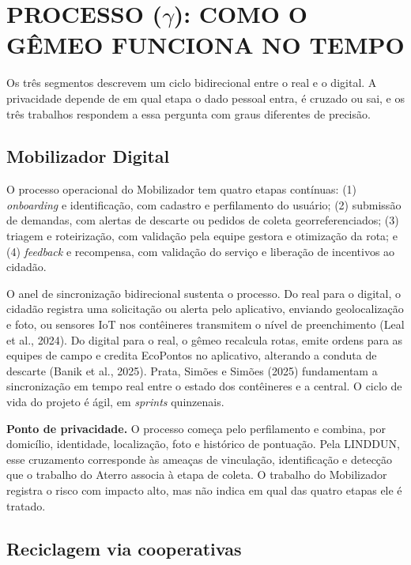 \documentclass[12pt,a4paper,article,oneside,english,brazil]{abntex2}
\begin{document}
\section{PROCESSO (\texorpdfstring{$\gamma$}{gama}): COMO O GÊMEO FUNCIONA NO TEMPO}

Os três segmentos descrevem um ciclo bidirecional entre o real e o digital. A privacidade depende de em qual etapa o dado pessoal entra, é cruzado ou sai, e os três trabalhos respondem a essa pergunta com graus diferentes de precisão.

\subsection{Mobilizador Digital}

O processo operacional do Mobilizador tem quatro etapas contínuas: (1) \textit{onboarding} e identificação, com cadastro e perfilamento do usuário; (2) submissão de demandas, com alertas de descarte ou pedidos de coleta georreferenciados; (3) triagem e roteirização, com validação pela equipe gestora e otimização da rota; e (4) \textit{feedback} e recompensa, com validação do serviço e liberação de incentivos ao cidadão.

O anel de sincronização bidirecional sustenta o processo. Do real para o digital, o cidadão registra uma solicitação ou alerta pelo aplicativo, enviando geolocalização e foto, ou sensores IoT nos contêineres transmitem o nível de preenchimento (Leal et al., 2024). Do digital para o real, o gêmeo recalcula rotas, emite ordens para as equipes de campo e credita EcoPontos no aplicativo, alterando a conduta de descarte (Banik et al., 2025). Prata, Simões e Simões (2025) fundamentam a sincronização em tempo real entre o estado dos contêineres e a central. O ciclo de vida do projeto é ágil, em \textit{sprints} quinzenais.

\textbf{Ponto de privacidade.} O processo começa pelo perfilamento e combina, por domicílio, identidade, localização, foto e histórico de pontuação. Pela LINDDUN, esse cruzamento corresponde às ameaças de vinculação, identificação e detecção que o trabalho do Aterro associa à etapa de coleta. O trabalho do Mobilizador registra o risco com impacto alto, mas não indica em qual das quatro etapas ele é tratado.

\subsection{Reciclagem via cooperativas}
\end{document}
